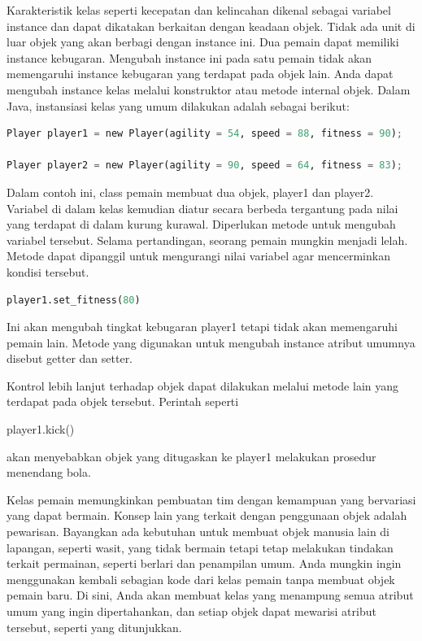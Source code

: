 \documentclass{article}
\begin{document}
Karakteristik kelas seperti kecepatan dan kelincahan dikenal sebagai variabel instance dan dapat dikatakan berkaitan dengan keadaan objek. Tidak ada unit di luar objek yang akan berbagi dengan instance ini. Dua pemain dapat memiliki instance kebugaran. Mengubah instance ini pada satu pemain tidak akan memengaruhi instance kebugaran yang terdapat pada objek lain. Anda dapat mengubah instance kelas melalui konstruktor atau metode internal objek. Dalam Java, instansiasi kelas yang umum dilakukan adalah sebagai berikut:
\begin{lstlisting}[language=Python, caption={}, captionpos=b]
Player player1 = new Player(agility = 54, speed = 88, fitness = 90);

Player player2 = new Player(agility = 90, speed = 64, fitness = 83);
\end{lstlisting}

Dalam contoh ini, class pemain membuat dua objek, player1 dan player2. Variabel di dalam kelas kemudian diatur secara berbeda tergantung pada nilai yang terdapat di dalam kurung kurawal. Diperlukan metode untuk mengubah variabel tersebut. Selama pertandingan, seorang pemain mungkin menjadi lelah. Metode dapat dipanggil untuk mengurangi nilai variabel agar mencerminkan kondisi tersebut.

\begin{lstlisting}[language=Python, caption={}, captionpos=b]
    player1.set_fitness(80)
\end{lstlisting}

Ini akan mengubah tingkat kebugaran player1 tetapi tidak akan memengaruhi pemain lain. Metode yang digunakan untuk mengubah instance atribut umumnya disebut getter dan setter.

Kontrol lebih lanjut terhadap objek dapat dilakukan melalui metode lain yang terdapat pada objek tersebut. Perintah seperti

player1.kick()

akan menyebabkan objek yang ditugaskan ke player1 melakukan prosedur menendang bola.

Kelas pemain memungkinkan pembuatan tim dengan kemampuan yang bervariasi yang dapat bermain. Konsep lain yang terkait dengan penggunaan objek adalah pewarisan. Bayangkan ada kebutuhan untuk membuat objek manusia lain di lapangan, seperti wasit, yang tidak bermain tetapi tetap melakukan tindakan terkait permainan, seperti berlari dan penampilan umum. Anda mungkin ingin menggunakan kembali sebagian kode dari kelas pemain tanpa membuat objek pemain baru. Di sini, Anda akan membuat kelas yang menampung semua atribut umum yang ingin dipertahankan, dan setiap objek dapat mewarisi atribut tersebut, seperti yang ditunjukkan.
\end{document}
